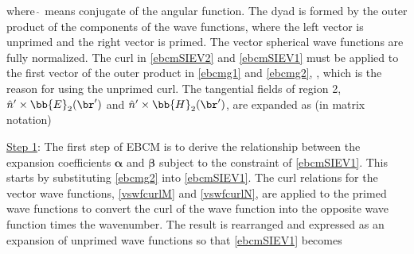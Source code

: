  
\noindent where $\hat{\ }$ means conjugate of the angular function. The dyad is formed by the outer product of the components of the wave functions, where the left vector is unprimed and the right vector is primed. The vector spherical wave functions are fully normalized. The curl in \eqref{ebcmSIEV2} and \eqref{ebcmSIEV1} must be applied to the first vector of the outer product in \eqref{ebcmg1} and \eqref{ebcmg2}, \cite{tai1997general}, which is the reason for using the unprimed curl. The tangential fields of region 2, $\hat{n}'\times\bb{E}_2(\br')$ and $\hat{n}'\times\bb{H}_2(\br')$, are expanded as (in matrix notation) 
\vspace{-2mm}

\underline{Step 1}: The first step of EBCM is to derive the relationship between the expansion coefficients $\boldsymbol{\alpha}$ and $\boldsymbol{\beta}$ subject to the constraint of \eqref{ebcmSIEV1}. This starts by substituting \eqref{ebcmg2} into \eqref{ebcmSIEV1}. The curl relations for the vector wave functions, \eqref{vswfcurlM} and \eqref{vswfcurlN}, are applied to the primed wave functions to convert the curl of the wave function into the opposite wave function times the wavenumber. The result is rearranged and expressed as an expansion of unprimed wave functions so that \eqref{ebcmSIEV1} becomes


